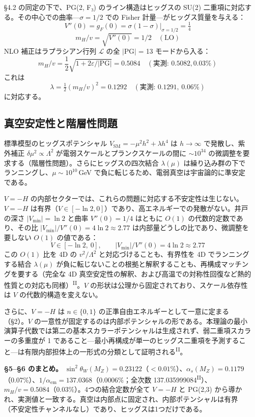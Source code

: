 \documentclass[fontsize=11pt,paper=a4,lualatex]{jlreq}
\newcommand{\PII}{\textsuperscript{\textup{II}}}
\begin{document}
§4.2 の同定の下で、PG(2, F₃) のライン構造はヒッグスの SU(2) 二重項に対応する。その中心での曲率---$\sigma = 1/2$ での Fisher 計量---がヒッグス質量を与える：
\[V''(0) = g_F(0) = \sigma(1-\sigma)\big|_{\sigma=1/2} = \tfrac{1}{4}\]
\[m_H/v = \sqrt{V''(0)} = 1/2 \quad (\mathrm{LO})\]
NLO 補正はラプラシアン行列 $\mathcal{L}$ の全 $|\mathrm{PG}|$ = 13 モードから入る：
\[m_H/v = \frac{1}{2}\sqrt{1 + 2\varepsilon/|\mathrm{PG}|} = 0.5084 \quad (\text{実測: } 0.5082, 0.03\%)\]
これは
\[\lambda = \tfrac{1}{2}(m_H/v)^2 = 0.1292\quad(\text{実測: } 0.1291,\ 0.06\%)\]
に対応する。

\subsection{真空安定性と階層性問題}

標準模型のヒッグスポテンシャル $V_\mathrm{SM} = -\mu^2 h^2 + \lambda h^4$ は $h \to \infty$ で発散し、紫外補正 $\delta\mu^2 \propto \Lambda^2$ が電弱スケールとプランクスケールの間に $\sim 10^{34}$ の微調整を要求する（階層性問題）。さらにヒッグスの四次結合 $\lambda(\mu)$ は繰り込み群の下でランニングし、$\mu \sim 10^{10}$\,GeV で負に転じるため、電弱真空は宇宙論的に準安定である。

$V = -H$ の内部セクターでは、これらの問題に対応する不安定性は生じない。$V = -H$ は有界（$V \in [-\ln 2, 0]$）であり、高エネルギーでの発散がない。井戸の深さ $|V_{\min}| = \ln 2$ と曲率 $V''(0) = 1/4$ はともに $O(1)$ の代数的定数であり、その比 $|V_{\min}|/V''(0) = 4\ln 2 \approx 2.77$ は内部量どうしの比であり、微調整を要しない $O(1)$ の値である：
\[V \in [-\ln 2,\ 0],\qquad |V_{\min}|/V''(0) = 4\ln 2 \approx 2.77\]
この $O(1)$ 比を 4D の $v^2/\Lambda^2$ と対応づけることも、有界性を 4D でランニングする結合 $\lambda(\mu)$ が負に転じないことの根拠と解釈することも、再構成マッチングを要する（完全な 4D 真空安定性の解釈、および高温での対称性回復など熱的性質との対応も同様）\PII{}。$V$ の形状は公理から固定されており、スケール依存性は $V$ の代数的構造を変えない。

さらに、$V = -H$ は $n \in \{0,1\}$ の正準自由エネルギーとして一意に定まる（§2）。$V$ の一意性が固定するのは内部ポテンシャルの形である。本理論の最小演算子代数では第二の基本スカラーポテンシャルは生成されず、弱二重項スカラーの多重度が 1 であること---最小再構成が単一のヒッグス二重項を予測すること---は有限内部担体上の一形式の分類として証明される\PII{}。

\noindent\textbf{§5--§6 のまとめ。} $\sin^2\!\theta_W(M_Z) = 0.23122$（$<0.01\%$）、$\alpha_s(M_Z) = 0.1179$（0.07\%）、$1/\alpha_\mathrm{em} = 137.0368$（0.0006\%；全次数 137.035999084\PII{}）、$m_H/v = 0.5084$（0.03\%）。4つの結合定数が全て $V = -H$ と PG(2,3) から導かれ、実測値と一致する。真空は内部点に固定され、内部ポテンシャルは有界（不安定性チャンネルなし）であり、ヒッグスは1つだけである。
\end{document}
